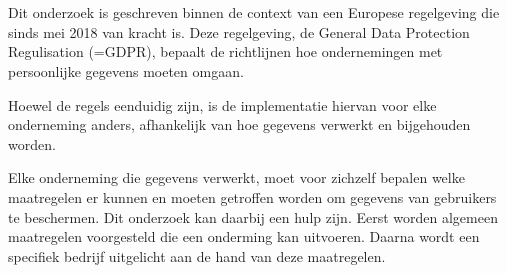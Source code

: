 
%
%

%



\chapter*{}

Dit onderzoek is geschreven binnen de context van een Europese regelgeving die sinds mei 2018 van kracht is. Deze regelgeving, de General Data Protection Regulisation (=GDPR), bepaalt de richtlijnen hoe ondernemingen met persoonlijke gegevens moeten omgaan. 

Hoewel de regels eenduidig zijn, is de implementatie hiervan voor elke onderneming anders, afhankelijk van hoe gegevens verwerkt en bijgehouden worden. 

Elke onderneming die gegevens verwerkt, moet voor zichzelf bepalen welke maatregelen er kunnen en moeten getroffen worden om gegevens van gebruikers te beschermen. Dit onderzoek kan daarbij een hulp zijn. Eerst worden algemeen maatregelen voorgesteld die een onderming kan uitvoeren. Daarna wordt een specifiek bedrijf uitgelicht aan de hand van deze maatregelen.

